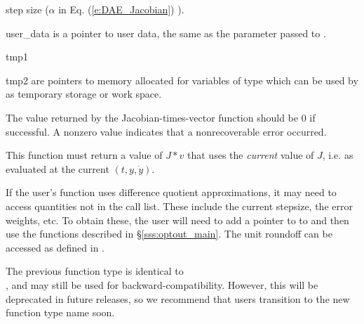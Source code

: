 {{\begin{args}
    step size ($\alpha$ in Eq. (\ref{e:DAE_Jacobian}) ).
  \item[user\_data]
    is a pointer to user data, the same as the 
    parameter passed to .
  \item[tmp1]
  \item[tmp2]
    are pointers to memory allocated for variables of type  which
    can be used by  as temporary storage or work space.
  \end{args}
}
{
  The value returned by the Jacobian-times-vector function should be 0 if
  successful.  A nonzero value indicates that a nonrecoverable error occurred.
}
{
  This function must return a value of $J*v$ that uses the {\it current}
  value of $J$, i.e. as evaluated at the current $(t,y,\dot{y})$.

  If the user's  function uses difference quotient
  approximations, it may need to access quantities not in the call
  list. These include the current stepsize, the error weights, etc.
  To obtain these, the user will need to add a pointer to 
  to  and then use the  functions described in
  \S\ref{sss:optout_main}. The unit roundoff can be accessed as
   defined in .

  The previous function type  is identical to
  \\ \noindent {}, and may still be used for
  backward-compatibility. However, this will be deprecated in future
  releases, so we recommend that users transition to the new function
  type name soon. 
}

}
